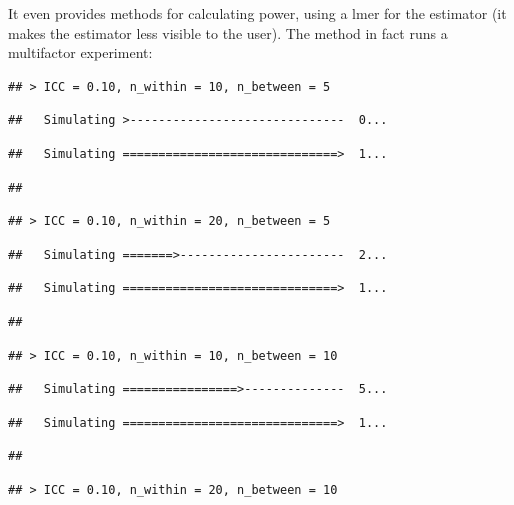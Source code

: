 \documentclass[
]{book}
\begin{document}
It even provides methods for calculating power, using a lmer for the estimator (it makes the estimator less visible to the user).
The method in fact runs a multifactor experiment:

\begin{verbatim}
## > ICC = 0.10, n_within = 10, n_between = 5
\end{verbatim}

\begin{verbatim}
##   Simulating >------------------------------  0...
\end{verbatim}

\begin{verbatim}
##   Simulating ==============================>  1...
\end{verbatim}

\begin{verbatim}
## 
\end{verbatim}

\begin{verbatim}
## > ICC = 0.10, n_within = 20, n_between = 5
\end{verbatim}

\begin{verbatim}
##   Simulating =======>-----------------------  2...
\end{verbatim}

\begin{verbatim}
##   Simulating ==============================>  1...
\end{verbatim}

\begin{verbatim}
## 
\end{verbatim}

\begin{verbatim}
## > ICC = 0.10, n_within = 10, n_between = 10
\end{verbatim}

\begin{verbatim}
##   Simulating ================>--------------  5...
\end{verbatim}

\begin{verbatim}
##   Simulating ==============================>  1...
\end{verbatim}

\begin{verbatim}
## 
\end{verbatim}

\begin{verbatim}
## > ICC = 0.10, n_within = 20, n_between = 10
\end{verbatim}
\end{document}
